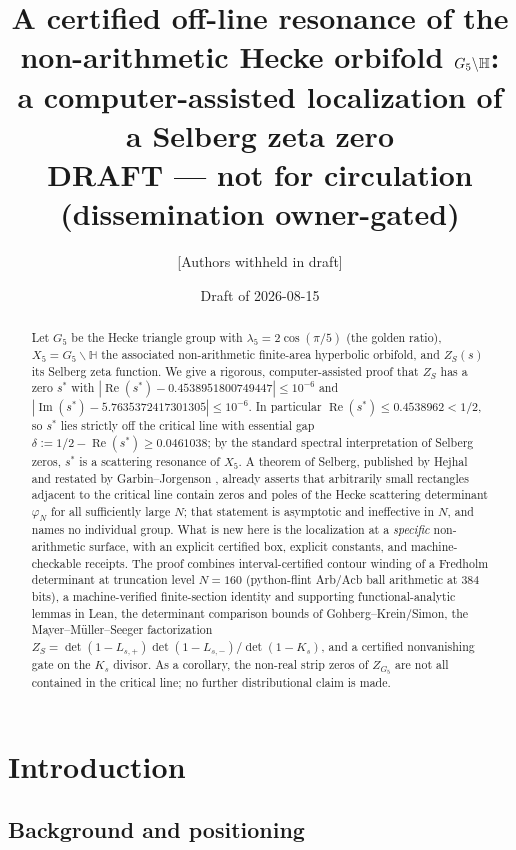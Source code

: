 \documentclass[11pt]{article}
\title{A certified off-line resonance of the non-arithmetic Hecke
orbifold $G_5\backslash\HH$: a computer-assisted localization of a
Selberg zeta zero\\[4pt]
{\large DRAFT --- not for circulation (dissemination owner-gated)}}
\author{[Authors withheld in draft]}
\date{Draft of 2026-08-15}
\theoremstyle{definition}
\theoremstyle{remark}
\newcommand{\HH}{\mathbb{H}}
\renewcommand{\Re}{\operatorname{Re}}
\renewcommand{\Im}{\operatorname{Im}}
\begin{document}
\maketitle

\begin{abstract}
Let $G_5$ be the Hecke triangle group with $\lambda_5 = 2\cos(\pi/5)$
(the golden ratio), $X_5 = G_5\backslash\HH$ the associated
non-arithmetic finite-area hyperbolic orbifold, and $Z_S(s)$ its
Selberg zeta function. We give a rigorous, computer-assisted proof that
$Z_S$ has a zero $s^*$ with
$|\Re(s^*) - 0.4538951800749447| \le 10^{-6}$ and
$|\Im(s^*) - 5.7635372417301305| \le 10^{-6}$.
In particular $\Re(s^*) \le 0.4538962 < 1/2$, so $s^*$ lies strictly
off the critical line with essential gap
$\delta := 1/2 - \Re(s^*) \ge 0.0461038$; by the standard spectral
interpretation of Selberg zeros, $s^*$ is a scattering resonance of
$X_5$. A theorem of Selberg, published by Hejhal
\cite[Thm~7.11, Cor.~7.12]{HejhalLNM1001} and restated by
Garbin--Jorgenson \cite{GarbinJorgenson18}, already asserts that
arbitrarily small rectangles adjacent to the critical line contain
zeros and poles of the Hecke scattering determinant $\varphi_N$ for all
sufficiently large $N$; that statement is asymptotic and ineffective in
$N$, and names no individual group. What is new here is the
localization at a \emph{specific} non-arithmetic surface, with an
explicit certified box, explicit constants, and machine-checkable
receipts. The proof
combines interval-certified contour winding of a Fredholm determinant
at truncation level $N=160$ (python-flint Arb/Acb ball arithmetic at
384 bits), a machine-verified finite-section identity and supporting
functional-analytic lemmas in Lean, the determinant comparison bounds
of Gohberg--Krein/Simon, the Mayer--M\"uller--Seeger factorization
$Z_S = \det(1-L_{s,+})\det(1-L_{s,-})/\det(1-K_s)$, and a certified
nonvanishing gate on the $K_s$ divisor. As a corollary, the non-real
strip zeros of $Z_{G_5}$ are not all contained in the critical line;
no further distributional claim is made.
\end{abstract}

\section{Introduction}

\subsection{Background and positioning}
\end{document}
